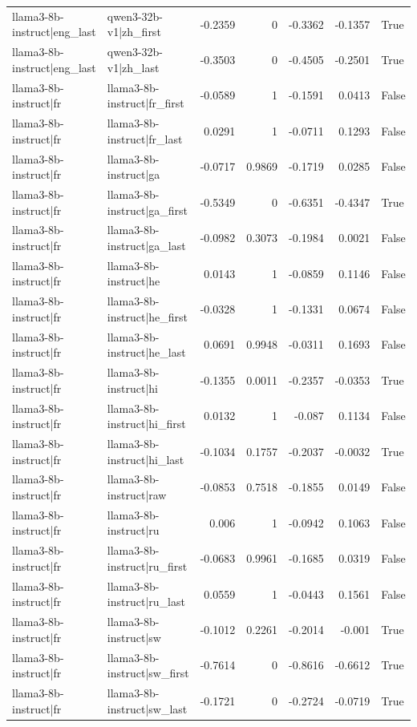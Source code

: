 \begin{table}
\begin{tabular}{l l r r r r l}
llama3-8b-instruct|eng_last & qwen3-32b-v1|zh_first & -0.2359 & 0 & -0.3362 & -0.1357 & True \\
llama3-8b-instruct|eng_last & qwen3-32b-v1|zh_last & -0.3503 & 0 & -0.4505 & -0.2501 & True \\
llama3-8b-instruct|fr & llama3-8b-instruct|fr_first & -0.0589 & 1 & -0.1591 & 0.0413 & False \\
llama3-8b-instruct|fr & llama3-8b-instruct|fr_last & 0.0291 & 1 & -0.0711 & 0.1293 & False \\
llama3-8b-instruct|fr & llama3-8b-instruct|ga & -0.0717 & 0.9869 & -0.1719 & 0.0285 & False \\
llama3-8b-instruct|fr & llama3-8b-instruct|ga_first & -0.5349 & 0 & -0.6351 & -0.4347 & True \\
llama3-8b-instruct|fr & llama3-8b-instruct|ga_last & -0.0982 & 0.3073 & -0.1984 & 0.0021 & False \\
llama3-8b-instruct|fr & llama3-8b-instruct|he & 0.0143 & 1 & -0.0859 & 0.1146 & False \\
llama3-8b-instruct|fr & llama3-8b-instruct|he_first & -0.0328 & 1 & -0.1331 & 0.0674 & False \\
llama3-8b-instruct|fr & llama3-8b-instruct|he_last & 0.0691 & 0.9948 & -0.0311 & 0.1693 & False \\
llama3-8b-instruct|fr & llama3-8b-instruct|hi & -0.1355 & 0.0011 & -0.2357 & -0.0353 & True \\
llama3-8b-instruct|fr & llama3-8b-instruct|hi_first & 0.0132 & 1 & -0.087 & 0.1134 & False \\
llama3-8b-instruct|fr & llama3-8b-instruct|hi_last & -0.1034 & 0.1757 & -0.2037 & -0.0032 & True \\
llama3-8b-instruct|fr & llama3-8b-instruct|raw & -0.0853 & 0.7518 & -0.1855 & 0.0149 & False \\
llama3-8b-instruct|fr & llama3-8b-instruct|ru & 0.006 & 1 & -0.0942 & 0.1063 & False \\
llama3-8b-instruct|fr & llama3-8b-instruct|ru_first & -0.0683 & 0.9961 & -0.1685 & 0.0319 & False \\
llama3-8b-instruct|fr & llama3-8b-instruct|ru_last & 0.0559 & 1 & -0.0443 & 0.1561 & False \\
llama3-8b-instruct|fr & llama3-8b-instruct|sw & -0.1012 & 0.2261 & -0.2014 & -0.001 & True \\
llama3-8b-instruct|fr & llama3-8b-instruct|sw_first & -0.7614 & 0 & -0.8616 & -0.6612 & True \\
llama3-8b-instruct|fr & llama3-8b-instruct|sw_last & -0.1721 & 0 & -0.2724 & -0.0719 & True \\

\end{tabular}
\end{table}
